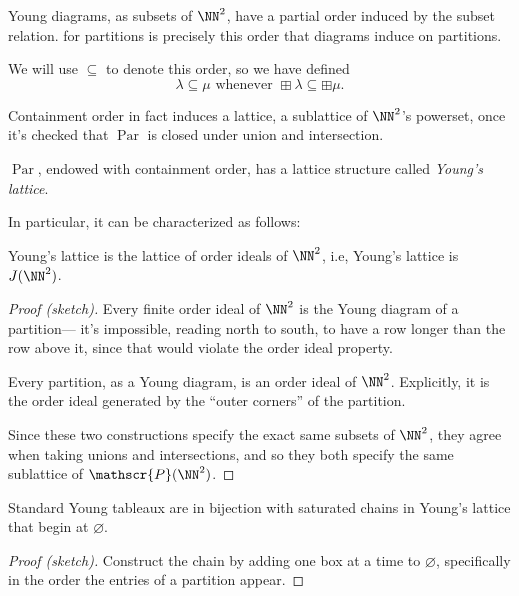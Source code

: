 \documentclass{article}
\DeclareMathOperator{\Par}{Par}
\begin{document}
\begin{definition}
    Young diagrams, as subsets of $\NN^2$, have a partial order induced by the subset relation. 
     for partitions is precisely this order that diagrams induce on partitions.

    We will use $\subseteq$ to denote this order, so we have defined
    \[
        \lambda \subseteq \mu \text{ whenever } \boxplus \lambda \subseteq \boxplus \mu.
    \]
\end{definition}

Containment order in fact induces a lattice, a sublattice of $\NN^2$'s powerset, once it's checked that $\Par$ is closed under union and intersection. 

\begin{remark}
    $\Par$, endowed with containment order, has a lattice structure called \textit{Young's lattice}.
\end{remark}

In particular, it can be characterized as follows:

\begin{theorem}
    Young's lattice is the lattice of order ideals of $\NN^2$, i.e, Young's lattice is $J(\NN^2)$.
\end{theorem}

\begin{proof}[Proof (sketch)]
    Every finite order ideal of $\NN^2$ is the Young diagram of a partition--- it's impossible, reading north to south, to have a row longer than the row above it, since that would violate the order ideal property.

    Every partition, as a Young diagram, is an order ideal of $\NN^2$.
    Explicitly, it is the order ideal generated by the ``outer corners'' of the partition.

    Since these two constructions specify the exact same subsets of $\NN^2$, they agree when taking unions and intersections, and so they both specify the same sublattice of $\mathscr{P}(\NN^2)$.
\end{proof}

\begin{theorem}
    Standard Young tableaux are in bijection with saturated chains in Young's lattice that begin at $\varnothing$.
\end{theorem}

\begin{proof}[Proof (sketch)]
    Construct the chain by adding one box at a time to $\varnothing$, specifically in the order the entries of a partition appear.
\end{proof}
\end{document}
